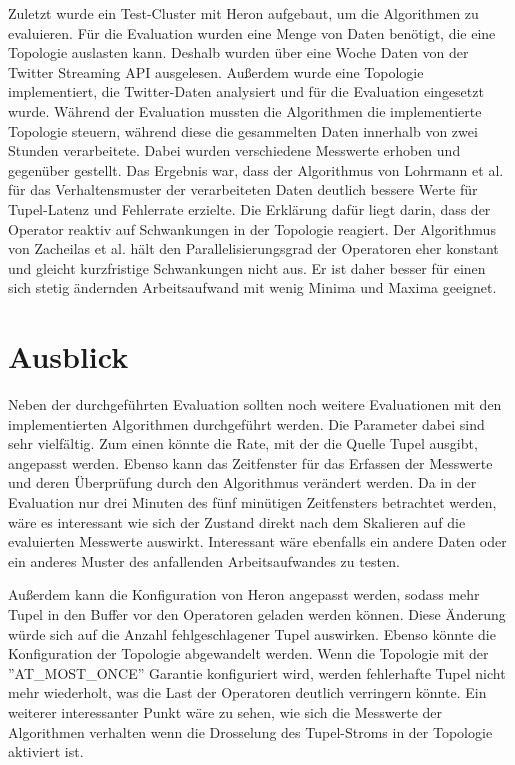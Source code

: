Zuletzt wurde ein Test-Cluster mit Heron aufgebaut, um die Algorithmen zu evaluieren.
Für die Evaluation wurden eine Menge von Daten benötigt, die eine Topologie auslasten kann.
Deshalb wurden über eine Woche Daten von der Twitter Streaming API ausgelesen.
Außerdem wurde eine Topologie implementiert, die Twitter-Daten analysiert und für die Evaluation eingesetzt wurde.
Während der Evaluation mussten die Algorithmen die implementierte Topologie steuern, während diese die gesammelten Daten innerhalb von zwei Stunden verarbeitete.
Dabei wurden verschiedene Messwerte erhoben und gegenüber gestellt.
Das Ergebnis war, dass der Algorithmus von Lohrmann et al. für das Verhaltensmuster der verarbeiteten Daten deutlich bessere Werte für Tupel-Latenz und Fehlerrate erzielte.
Die Erklärung dafür liegt darin, dass der Operator reaktiv auf Schwankungen in der Topologie reagiert.
Der Algorithmus von Zacheilas et al. hält den Parallelisierungsgrad der Operatoren eher konstant und gleicht kurzfristige Schwankungen nicht aus.
Er ist daher besser für einen sich stetig ändernden Arbeitsaufwand mit wenig Minima und Maxima geeignet.

\section*{Ausblick}

Neben der durchgeführten Evaluation sollten noch weitere Evaluationen mit den implementierten Algorithmen durchgeführt werden.
Die Parameter dabei sind sehr vielfältig.
Zum einen könnte die Rate, mit der die Quelle Tupel ausgibt, angepasst werden.
Ebenso kann das Zeitfenster für das Erfassen der Messwerte und deren Überprüfung durch den Algorithmus verändert werden.
Da in der Evaluation nur drei Minuten des fünf minütigen Zeitfensters betrachtet werden, wäre es interessant wie sich der Zustand direkt nach dem Skalieren auf die evaluierten Messwerte auswirkt.
Interessant wäre ebenfalls ein andere Daten oder ein anderes Muster des anfallenden Arbeitsaufwandes zu testen.

Außerdem kann die Konfiguration von Heron angepasst werden, sodass mehr Tupel in den Buffer vor den Operatoren geladen werden können.
Diese Änderung würde sich auf die Anzahl fehlgeschlagener Tupel auswirken.
Ebenso könnte die Konfiguration der Topologie abgewandelt werden.
Wenn die Topologie mit der ''AT\_MOST\_ONCE'' Garantie konfiguriert wird, werden fehlerhafte Tupel nicht mehr wiederholt,
was die Last der Operatoren deutlich verringern könnte.
Ein weiterer interessanter Punkt wäre zu sehen, wie sich die Messwerte der Algorithmen verhalten wenn die Drosselung des Tupel-Stroms in der Topologie aktiviert ist.

